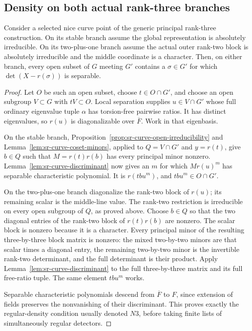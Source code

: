 \subsection{Density on both actual rank-three branches}
\begin{srtheorem}
\label{thm:sr-curve-N3}
Consider a selected nice curve point of the generic principal
rank-three construction.  On its stable branch assume the
global representation is absolutely irreducible.
On its two-plus-one branch assume the actual outer
rank-two block is absolutely irreducible and the middle
coordinate is a character.
Then, on either branch, every open subset of \(G\)
meeting \(G'\) contains a \(\sigma\in G'\) for which
\(\det(X-r(\sigma))\) is separable.
\end{srtheorem}
\begin{proof}
Let \(O\) be such an open subset, choose \(t\in O\cap G'\),
and choose an open subgroup \(V\subset G\) with \(tV\subset O\).
Local separation supplies \(u\in V\cap G'\) whose full
ordinary eigenvalue tuple \(\alpha\) has torsion-free
pairwise ratios.  It has distinct eigenvalues, so
\(r(u)\) is diagonalizable over \(\overline F\).
Work in that eigenbasis.

On the stable branch,
Proposition~\ref{prop:sr-curve-open-irreducibility} and
Lemma~\ref{lem:sr-curve-coset-minors}, applied to
\(Q=V\cap G'\) and \(y=r(t)\), give \(b\in Q\)
such that \(M=r(t)r(b)\) has every principal minor nonzero.
Lemma~\ref{lem:sr-curve-discriminant} now gives an \(m\)
for which \(Mr(u)^m\) has separable characteristic polynomial.
It is \(r(tb u^m)\), and \(tb u^m\in O\cap G'\).

On the two-plus-one branch diagonalize the rank-two block
of \(r(u)\); its remaining scalar is the middle-line value.
The rank-two restriction is irreducible on every open subgroup
of \(Q\), as proved above.
Choose \(b\in Q\) so that the two diagonal entries of
the rank-two block of \(r(t)r(b)\) are nonzero.
The scalar block is nonzero because it is a character.
Every principal minor of the resulting three-by-three
block matrix is nonzero: the mixed two-by-two minors are
that scalar times a diagonal entry, the remaining
two-by-two minor is the invertible rank-two determinant,
and the full determinant is their product.
Apply Lemma~\ref{lem:sr-curve-discriminant} to the full
three-by-three matrix and its full free-ratio tuple.
The same element \(tb u^m\) works.

Separable characteristic polynomials descend from
\(\overline F\) to \(F\), since extension of fields preserves
the nonvanishing of their discriminant.
This proves exactly the regular-density condition
usually denoted \(N3\), before taking finite lists of
simultaneously regular detectors.
\end{proof}

